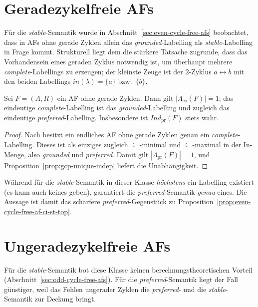 \section{Geradezykelfreie AFs}
\label{sec:gcp-even}

F\"ur die \textit{stable}-Semantik wurde in
Abschnitt~\ref{sec:even-cycle-free-afs} beobachtet, dass in AFs ohne gerade
Zyklen allein das \textit{grounded}-Labelling als \textit{stable}-Labelling in
Frage kommt. Strukturell liegt dem die st\"arkere Tatsache zugrunde, dass das
Vorhandensein eines geraden Zyklus notwendig ist, um \"uberhaupt mehrere
\textit{complete}-Labellings zu erzeugen; der kleinste Zeuge ist der
\(2\)-Zyklus \(a\leftrightarrow b\) mit den beiden Labellings
\(\mathit{in}(\lambda)=\{a\}\) bzw.\ \(\{b\}\).

\begin{Proposition}
    \label{prop:gcp-even-indep}
    Sei \(F=(A,R)\) ein AF ohne gerade Zyklen. Dann gilt
    \(|\Lambda_{\mathrm{co}}(F)|=1\); das eindeutige
    \textit{complete}-Labelling ist das \textit{grounded}-Labelling und zugleich
    das eindeutige \textit{preferred}-Labelling. Insbesondere ist
    \(\textit{Ind}_{\mathrm{pr}}(F)\) stets wahr.
\end{Proposition}

\begin{proof}
    Nach \cite{handbook__of_formal_argumentation__vol__3:2024} besitzt ein
    endliches AF ohne gerade Zyklen genau ein \textit{complete}-Labelling.
    Dieses ist als einziges zugleich \(\subseteq\)-minimal und
    \(\subseteq\)-maximal in der In-Menge, also \textit{grounded} und
    \textit{preferred}. Damit gilt \(|\Lambda_{\mathrm{pr}}(F)|=1\), und
    Proposition~\ref{prop:gcp-unique-indep} liefert die Unabh\"angigkeit.
\end{proof}

W\"ahrend f\"ur die \textit{stable}-Semantik in dieser Klasse \emph{h\"ochstens}
ein Labelling existiert (es kann auch keines geben), garantiert die
\textit{preferred}-Semantik \emph{genau} eines. Die Aussage ist damit das
sch\"arfere \textit{preferred}-Gegenst\"uck zu
Proposition~\ref{prop:even-cycle-free-af-ci-st-top}.

\section{Ungeradezykelfreie AFs}
\label{sec:gcp-odd}

F\"ur die \textit{stable}-Semantik bot diese Klasse keinen
berechnungstheoretischen Vorteil (Abschnitt~\ref{sec:odd-cycle-free-afs}). F\"ur
die \textit{preferred}-Semantik liegt der Fall g\"unstiger, weil das Fehlen
ungerader Zyklen die \textit{preferred}- und die \textit{stable}-Semantik zur
Deckung bringt.

